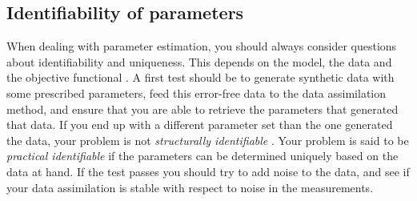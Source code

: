 



\subsection{Identifiability of parameters}
\label{sec:intro_identifiability}
When dealing with parameter estimation, you should always consider
questions about identifiability and uniqueness. This depends on the
model, the data and the objective functional
\cite{hadjicharalambous2015analysis}. A first test should be to
generate synthetic data with some prescribed parameters, feed this
error-free data to the data assimilation method, and ensure that you
are able to retrieve the parameters that generated that data. If you
end up with a different parameter set than the one generated the data,
your problem is not \emph{structurally identifiable}
\cite{chabiniok2016multiphysics}. Your problem is said to be
\emph{practical identifiable} if the parameters can be determined
uniquely based on the data at hand. If the test passes you should try
to add noise to the data, and see if your data assimilation is stable
with respect to noise in the measurements.

